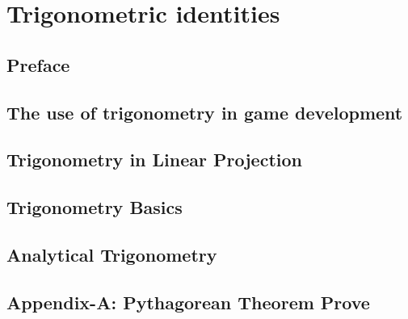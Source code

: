 \section{Trigonometric identities}

\subsection{Preface}

\subsection{The use of trigonometry in game development}

\subsection{Trigonometry in Linear Projection}

\subsection{Trigonometry Basics}



\subsection{Analytical Trigonometry}



\subsection{Appendix-A: Pythagorean Theorem Prove}
